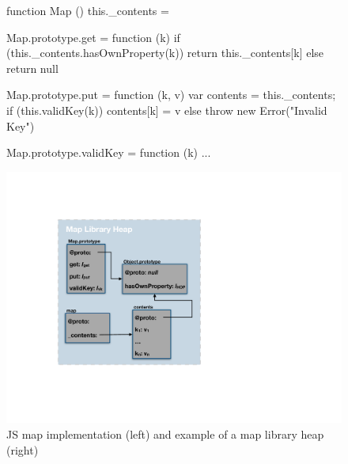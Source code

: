  \begin{figure}[t!]
 \begin{minipage}{0.6\textwidth}
 \begin{lstjs}[firstnumber=1]
function Map () { this._contents = {} }

Map.prototype.get = function (k) {
    if (this._contents.hasOwnProperty(k)) { 
      return this._contents[k] 
    } else { return null }  
}

Map.prototype.put = function (k, v) {
   var contents = this._contents;
   if (this.validKey(k)) {  
     contents[k] = v   
   } else {
     throw new Error("Invalid Key") 
   } 
} 

Map.prototype.validKey = function (k) { ... }
\end{lstjs}
\end{minipage}
 \begin{minipage}{0.4\textwidth}
 \includegraphics[width=1.1\textwidth]{figures/mapDiagram.pdf}
 \end{minipage}
\caption{JS map implementation (left) and example of a map library heap (right) \label{map:example}}
\end{figure}

